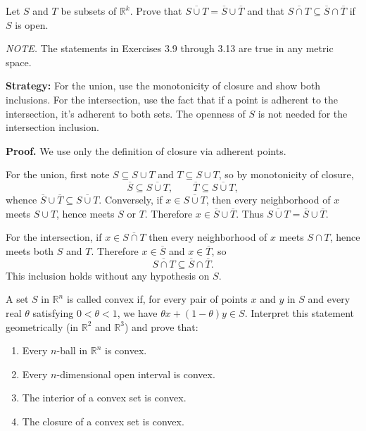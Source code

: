 \begin{problembox}
\begin{problemstatement}
Let $S$ and $T$ be subsets of $\mathbb{R}^k$. Prove that $\overline{S \cup T} = \overline{S} \cup \overline{T}$ and that $\overline{S \cap T} \subseteq \overline{S} \cap \overline{T}$ if $S$ is open.

\textit{NOTE.} The statements in Exercises 3.9 through 3.13 are true in any metric space.
\end{problemstatement}
\end{problembox}

\noindent\textbf{Strategy:} For the union, use the monotonicity of closure and show both inclusions. For the intersection, use the fact that if a point is adherent to the intersection, it's adherent to both sets. The openness of $S$ is not needed for the intersection inclusion.

\noindent\textbf{Proof.}
We use only the definition of closure via adherent points.

For the union, first note $S\subseteq S\cup T$ and $T\subseteq S\cup T$, so by monotonicity of closure,
\[\overline S\subseteq \overline{S\cup T},\qquad \overline T\subseteq \overline{S\cup T},\]
whence $\overline S\cup\overline T\subseteq \overline{S\cup T}$. Conversely, if $x\in \overline{S\cup T}$, then every neighborhood of $x$ meets $S\cup T$, hence meets $S$ or $T$. Therefore $x\in\overline S\cup\overline T$. Thus $\overline{S\cup T}=\overline S\cup\overline T$.

For the intersection, if $x\in \overline{S\cap T}$ then every neighborhood of $x$ meets $S\cap T$, hence meets both $S$ and $T$. Therefore $x\in\overline S$ and $x\in\overline T$, so
\[\overline{S\cap T}\subseteq \overline S\cap \overline T.\]
This inclusion holds without any hypothesis on $S$.



\begin{problembox}
\begin{problemstatement}
A set \( S \) in \( \mathbb{R}^n \) is called convex if, for every pair of points \( x \) and \( y \) in \( S \) and every real \( \theta \) satisfying \( 0 < \theta < 1 \), we have \( \theta x + (1 - \theta)y \in S \). Interpret this statement geometrically (in \( \mathbb{R}^2 \) and \( \mathbb{R}^3 \)) and prove that:
\begin{enumerate}[label=\alph*)]
\item Every \( n \)-ball in \( \mathbb{R}^n \) is convex.
\item Every \( n \)-dimensional open interval is convex.
\item The interior of a convex set is convex.
\item The closure of a convex set is convex.
\end{enumerate}
\end{problemstatement}
\end{problembox}

